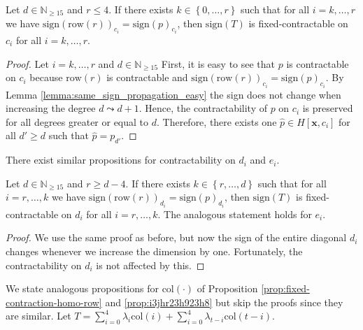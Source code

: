 \begin{proposition}\label{prop:fixed-contraction-homo-row}
    Let \( d \in \mathbb{N}_{\geq 15} \) and \( r \leq 4 \). If there exists \( k \in \left\{ 0, \dots, r \right\} \) such that for all \( i = k, \dots, r\) we have \(  \mathrm{sign}(\mathrm{row}(r))_{c_i} = \mathrm{sign}(p)_{c_i} \),
    then  \( \mathrm{sign}(T) \) is fixed-contractable on \( c_i \) for all \( i = k, \dots, r \).
\end{proposition}

\begin{proof}
    Let \( i = k, \dots, r \) and \( d \in \mathbb{N}_{\geq 15} \)
    First, it is easy to see that \( p \) is contractable on \( c_i \) because \( \mathrm{row}(r) \) is contractable and \( \mathrm{sign}(\mathrm{row}(r))_{c_i} = \mathrm{sign}(p)_{c_i} \). By Lemma \ref{lemma:same_sign_propagation_easy} the sign does not change when increasing the degree \( d \leadsto d+1 \). Hence, the contractability of \( p \) on \( c_i \) is preserved for all degrees greater or equal to \( d \). Therefore, there exists one \( \hat p \in H[\mathbf{x}, c_i] \) for all \( d' \geq d \) such that \( \hat p = p_{d'} \).
\end{proof}

There exist similar propositions for contractability on \( d_i \) and \( e_i \).

\begin{proposition}\label{prop:i3jhr23h923h8}
    Let \( d \in \mathbb{N}_{\geq 15} \) and \( r \geq d-4 \). If there exists \( k \in \left\{ r, \dots, d \right\} \) such that for all \( i = r, \dots, k\) we have \(  \mathrm{sign}(\mathrm{row}(r))_{d_i} = \mathrm{sign}(p)_{d_i} \),
then  \( \mathrm{sign}(T) \) is fixed-contractable on \( d_i \) for all \( i = r, \dots, k\). The analogous statement holds for \( e_i \).
\end{proposition}

\begin{proof}
    We use the same proof as before, but now the sign of the entire diagonal $d_{i}$ changes whenever we increase the dimension by one. Fortunately, the contractability on $d_{i}$ is not affected by this. 
\end{proof}

We state analogous propositions for \( \mathrm{col}(\cdot) \) of Proposition \ref{prop:fixed-contraction-homo-row} and \ref{prop:i3jhr23h923h8} but skip the proofs since they are similar. Let \(  T = \sum_{i=0}^{4}  \lambda_{i} \mathrm{col}(i) + \sum_{i=0}^{4}  \lambda_{t-i} \mathrm{col}(t-i) \).

